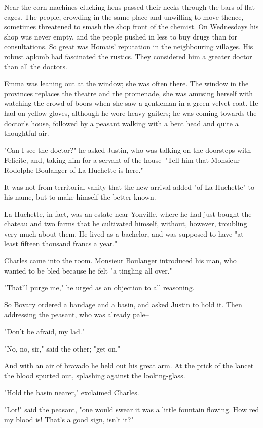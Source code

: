 \documentclass{tufte-book}
\begin{document}
Near the corn-machines clucking hens passed their necks through the bars
of flat cages. The people, crowding in the same place and unwilling
to move thence, sometimes threatened to smash the shop front of the
chemist. On Wednesdays his shop was never empty, and the people pushed
in less to buy drugs than for consultations. So great was Homais'
reputation in the neighbouring villages. His robust aplomb had
fascinated the rustics. They considered him a greater doctor than all
the doctors.

Emma was leaning out at the window; she was often there. The window in
the provinces replaces the theatre and the promenade, she was amusing
herself with watching the crowd of boors when she saw a gentleman in
a green velvet coat. He had on yellow gloves, although he wore heavy
gaiters; he was coming towards the doctor's house, followed by a peasant
walking with a bent head and quite a thoughtful air.

"Can I see the doctor?" he asked Justin, who was talking on the
doorsteps with Felicite, and, taking him for a servant of the
house--"Tell him that Monsieur Rodolphe Boulanger of La Huchette is
here."

It was not from territorial vanity that the new arrival added "of La
Huchette" to his name, but to make himself the better known.

La Huchette, in fact, was an estate near Yonville, where he had just
bought the chateau and two farms that he cultivated himself, without,
however, troubling very much about them. He lived as a bachelor, and was
supposed to have "at least fifteen thousand francs a year."

Charles came into the room. Monsieur Boulanger introduced his man, who
wanted to be bled because he felt "a tingling all over."

"That'll purge me," he urged as an objection to all reasoning.

So Bovary ordered a bandage and a basin, and asked Justin to hold it.
Then addressing the peasant, who was already pale--

"Don't be afraid, my lad."

"No, no, sir," said the other; "get on."

And with an air of bravado he held out his great arm. At the prick of
the lancet the blood spurted out, splashing against the looking-glass.

"Hold the basin nearer," exclaimed Charles.

"Lor!" said the peasant, "one would swear it was a little fountain
flowing. How red my blood is! That's a good sign, isn't it?"
\end{document}

